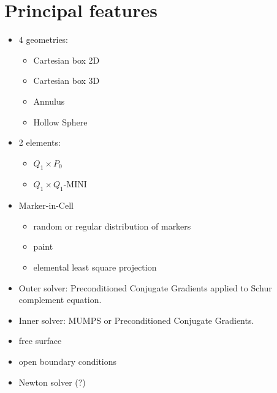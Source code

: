 
\section{Principal features}

\begin{itemize}
\item 4 geometries:
\begin{itemize}
\item Cartesian box 2D
\item Cartesian box 3D
\item Annulus
\item Hollow Sphere
\end{itemize}
\item 2 elements:
\begin{itemize}
\item $Q_1\times P_0$
\item $Q_1\times Q_1$-MINI
\end{itemize}
\item Marker-in-Cell
\begin{itemize}
\item random or regular distribution of markers
\item paint  
\item elemental least square projection
\end{itemize}


\item Outer solver: Preconditioned Conjugate Gradients applied to Schur complement equation.
\item Inner solver: MUMPS or Preconditioned Conjugate Gradients.
\item free surface
\item open boundary conditions
\item Newton solver (?)
\end{itemize}

